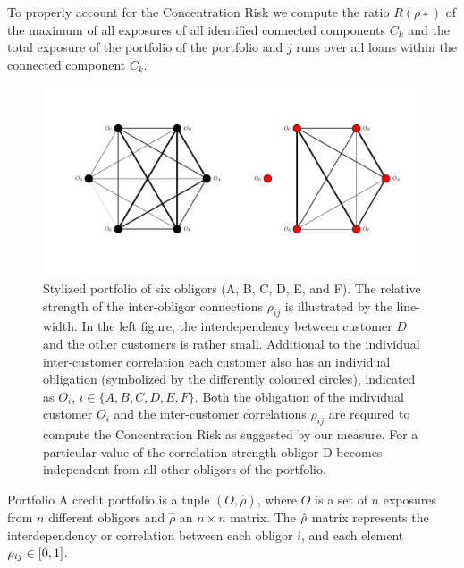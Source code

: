 To properly account for the Concentration Risk we compute the ratio $R(ρ∗)$ of the maximum of all exposures of all identified connected components $C_k$ and the total exposure of the portfolio
of the portfolio and $j$ runs over all loans within the connected component $C_k$.
\begin{figure}[tb]
	\centering
	\includegraphics[scale=0.5]{figures/ramping_parameter_example.png}
	\caption{
Stylized portfolio of six obligors (A, B, C, D, E, and F).
The relative strength of the inter-obligor connections $\rho_{ij}$ is illustrated by the line-width.
In the left figure, the interdependency between customer $D$ and the other customers is rather small.
Additional to the individual inter-customer correlation each customer also has an individual obligation (symbolized by the differently coloured circles), indicated as $O_i$, $i \in \{A, B, C, D, E, F \}$.
Both the obligation of the individual customer $O_i$ and the inter-customer correlations $\rho_{ij}$ are required to compute the Concentration Risk as suggested by our measure.
For a particular value of the correlation strength obligor D becomes independent from all other obligors of the portfolio.
	}
	\label{fig:6_pf_ramping}
\end{figure}


 
 
 
 
\begin{definition}{Portfolio}
A credit portfolio is a tuple $(O, \hat{\rho})$, where $O$ is a set of $n$ exposures from $n$ different obligors and $\hat{\rho}$ an $n \times n$ matrix.
The $\hat{\rho}$ matrix represents the interdependency or correlation between each obligor $i$, and each element $\rho_{ij} \in [0,1]$.
\end{definition}

